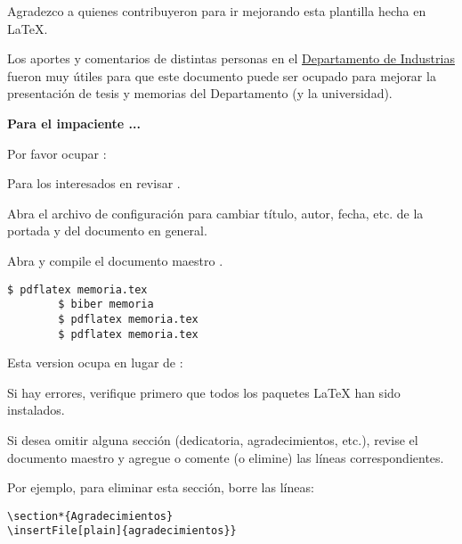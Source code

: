 
	Agradezco a quienes contribuyeron para ir mejorando esta plantilla hecha en \LaTeX{}. 
    
    Los aportes y comentarios de distintas personas en el \href{http://www.industrias.usm.cl}{Departamento de Industrias} fueron muy útiles para que este documento puede ser ocupado para mejorar la presentación de tesis y memorias del Departamento (y la universidad).
    
\vspace{20mm}
\begin{framed}
\noindent\textbf{\color{red}Para el impaciente ...}

Por favor ocupar :


Para los interesados en  revisar \parencite{git2017}.

Abra el archivo de configuración  para cambiar título, autor, fecha, etc. de la portada y del documento en general.

Abra  y compile el documento maestro .

\begin{Verbatim}[fontsize=\small]
        $ pdflatex memoria.tex
        $ biber memoria
        $ pdflatex memoria.tex
        $ pdflatex memoria.tex
\end{Verbatim}

Esta version ocupa  en lugar de :

Si hay errores, verifique primero que todos los paquetes \LaTeX{} han sido instalados.

Si desea omitir alguna sección (dedicatoria, agradecimientos, etc.), revise el documento maestro  y agregue o comente (o elimine) las líneas correspondientes.

Por ejemplo, para eliminar esta sección, borre las líneas:

\begin{Verbatim}[frame=lines, label=\inlinecode{memoria.tex} (extracto)
, fontsize=\footnotesize
, baselinestretch=1
, formatcom=\color{gray}]
\section*{Agradecimientos}
\insertFile[plain]{agradecimientos}}
\end{Verbatim}
\end{framed}
